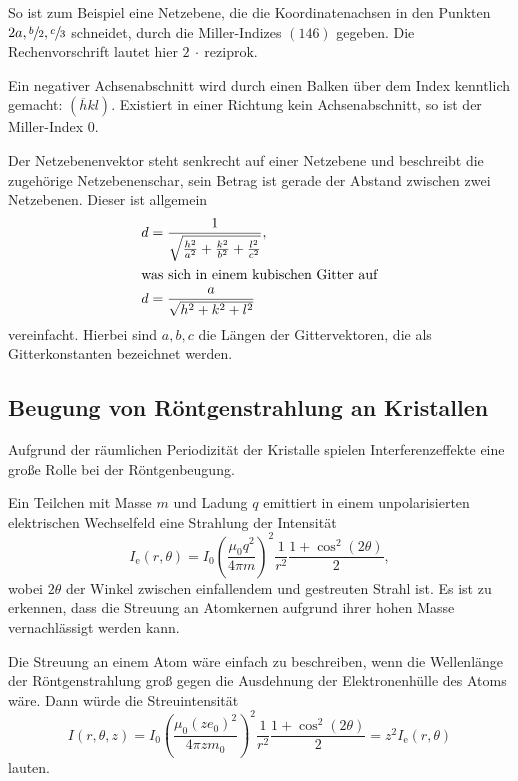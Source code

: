 So ist zum Beispiel eine Netzebene, die die Koordinatenachsen in den
Punkten $2a, \sfrac{b}{2}, \sfrac{c}{3}$ schneidet,
durch die Miller-Indizes $(146)$ gegeben.
Die Rechenvorschrift lautet hier $2~\cdot~\text{reziprok}$.

Ein negativer Achsenabschnitt wird durch einen Balken über dem Index
kenntlich gemacht: $\left(\overline{h}kl\right)$.
Existiert in einer Richtung kein Achsenabschnitt, so ist der Miller-Index 0.

Der Netzebenenvektor steht senkrecht auf einer Netzebene und beschreibt
die zugehörige Netzebenenschar, sein Betrag ist gerade der Abstand zwischen zwei Netzebenen.
Dieser ist allgemein
\begin{align}
  d &= \frac{1}{\sqrt{%
    \frac{h^2}{a^2} + \frac{k^2}{b^2} + \frac{l^2}{c^2}
  }}, \\
  \intertext{was sich in einem kubischen Gitter auf}
  \label{eq:netzebenensbstand}
  d &= \frac{a}{\sqrt{%
    h^2 + k^2 + l^2
  }}
\end{align}
vereinfacht.
Hierbei sind $a, b, c$ die Längen der Gittervektoren, die als Gitterkonstanten bezeichnet werden.

\subsection{Beugung von Röntgenstrahlung an Kristallen}
Aufgrund der räumlichen Periodizität der Kristalle spielen
Interferenzeffekte eine große Rolle bei der Röntgenbeugung.

Ein Teilchen mit Masse $m$ und Ladung $q$ emittiert in einem
unpolarisierten elektrischen Wechselfeld eine Strahlung der Intensität
\begin{equation}
  \label{eq:strahlung_elektron}
  I_\text{e} (r, \theta) = I_0 {\left(\frac{\mu_0 q^2}{4\pi m}\right)}^2 \frac{1}{r^2} \frac{1+ \cos^2\! (2\theta)}{2},
\end{equation}
wobei $2\theta$ der Winkel zwischen einfallendem und gestreuten Strahl ist.
Es ist zu erkennen, dass die Streuung an Atomkernen aufgrund ihrer hohen Masse
vernachlässigt werden kann.

Die Streuung an einem Atom wäre einfach zu beschreiben, wenn die Wellenlänge
der Röntgenstrahlung groß gegen die Ausdehnung der Elektronenhülle des Atoms wäre.
Dann würde die Streuintensität
\begin{equation}
  \label{eq:strahlung_huellenelektron}
  I (r, \theta, z) = I_0 {\left(\frac{\mu_0 {\left(z e_0 \right)}^2}{4\pi z m_0}\right)}^2 \frac{1}{r^2} \frac{1+\cos^2\! (2\theta)}{2}
  = z^2 I_\text{e} (r, \theta)
\end{equation}
lauten.

